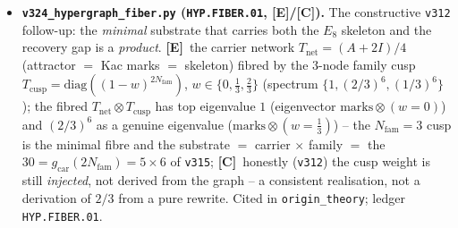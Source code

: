 \documentclass[11pt]{article}
\providecommand{\mE}{\textbf{[E]}}\providecommand{\mC}{\textbf{[C]}}
\providecommand{\mO}{\textbf{[O]}}\providecommand{\mX}{\textbf{[X]}}
\providecommand{\gcar}{g_{\mathrm{car}}}\providecommand{\Nfam}{N_{\mathrm{fam}}}
\begin{document}
\begin{itemize}
  honest step via Bisognano--Wichmann. \mE\ the $\mu_4$ clock is a geometric rotation
  $\rho{=}\mathrm{diag}(i^n){=}\exp(i\tfrac\pi2 L)$, $\mu_4\subset U(1)_{\mathrm{rot}}$; \mE\ for a rotation-covariant
  covariance $C{=}f(L)$ the modular Hamiltonian $K{=}\log((1{-}C)/C){=}g(L)$, so $[K,L]{=}0$ (the modular flow is
  geometric) and the clock is a modular symmetry \emph{for free} (the discriminator: a period-$4$ curvature preserves
  the clock but its flow is not geometric, $[K,L]\ne0$); \mC\ given the seam is the $(E_8)_1$ chiral net
  (\texttt{v308}), BW/Hislop--Longo make the vacuum modular flow geometric, so \texttt{QGEO.SYM.01}
  ($\omega\circ\rho{=}\omega$) is \emph{downstream} of \texttt{SEAM.EQUIV.01} $+$ a rotation-invariant vacuum, not an
  independent axiom; \mO\ residual: the raw collar vacuum is rotation-invariant (cleaner than \texttt{v309}, shared
  with \texttt{v308}). Cited in \texttt{origin\_theory}; ledger \texttt{QGEO.BW.01}.
\item \textbf{\texttt{v324\_hypergraph\_fiber.py} (\texttt{HYP.FIBER.01}, \mE/\mC).} The constructive \texttt{v312}
  follow-up: the \emph{minimal} substrate that carries both the $E_8$ skeleton and the recovery gap is a
  \emph{product}. \mE\ the carrier network $T_{\mathrm{net}}{=}(A{+}2I)/4$ (attractor $=$ Kac marks $=$ skeleton)
  fibred by the $3$-node family cusp $T_{\mathrm{cusp}}{=}\mathrm{diag}((1{-}w)^{2\Nfam})$, $w\in\{0,\tfrac13,\tfrac23\}$
  (spectrum $\{1,(2/3)^6,(1/3)^6\}$); the fibred $T_{\mathrm{net}}\otimes T_{\mathrm{cusp}}$ has top eigenvalue $1$
  (eigenvector $\mathrm{marks}\otimes(w{=}0)$) and $(2/3)^6$ as a genuine eigenvalue ($\mathrm{marks}\otimes(w{=}\tfrac13)$)
  -- the $\Nfam{=}3$ cusp is the minimal fibre and the substrate $=$ carrier $\times$ family $=$ the
  $30{=}\gcar(2\Nfam){=}5{\times}6$ of \texttt{v315}; \mC\ honestly (\texttt{v312}) the cusp weight is still
  \emph{injected}, not derived from the graph -- a consistent realisation, not a derivation of $2/3$ from a pure
  rewrite. Cited in \texttt{origin\_theory}; ledger \texttt{HYP.FIBER.01}.
\end{itemize}
\end{document}

